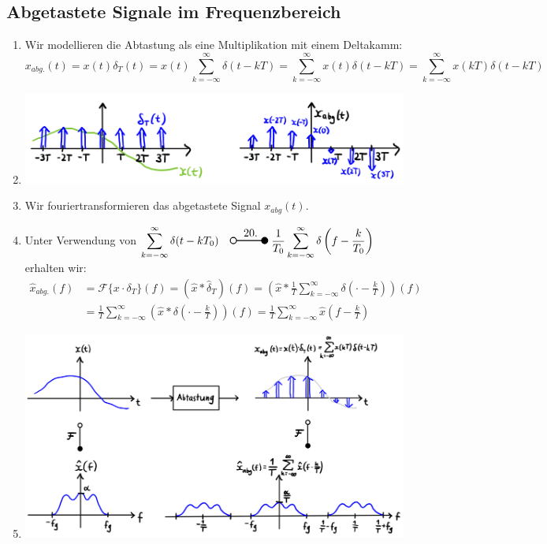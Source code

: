 \documentclass[11pt]{article}
\newcommand{\transform}[2]{%
    \begin{tikzpicture}
        \draw[thick] (0,0) circle (0.1);
        \draw[thick] (0.1,0) -- (#2,0) node[midway, above] {#1};
        \filldraw[thick] (#2,0) circle (0.1);
    \end{tikzpicture}%
}
\begin{document}
\subsection*{Abgetastete Signale im Frequenzbereich}
\vspace*{-0.5cm}
\begin{enumerate}
    \item Wir modellieren die Abtastung als eine Multiplikation mit einem Deltakamm:
    $$x_{abg.}(t) = x(t)\delta_T(t) = x(t)\sum_{k=-\infty}^{\infty} \delta(t-kT) = \sum_{k=-\infty}^{\infty}x(t)\delta(t-kT) = \sum_{k=-\infty}^{\infty} x(kT)\delta(t-kT)$$
    \vspace*{-0.5cm}
    \item[] \begin{center}
        \includegraphics[width=0.6\linewidth]{docimgs/abtastung1.jpg}
    \end{center}
    \vspace*{-0.25cm}
    \item Wir fouriertransformieren das abgetastete Signal $x_{abg}(t)$.
    \item[] Unter Verwendung von $\displaystyle\sum_{k=-\infty}^{\infty} \delta(t-kT_0) \hspace{10pt} \transform{20.}{1} \; \displaystyle\frac{1}{T_0}\displaystyle\sum_{k=-\infty}^{\infty} \delta \left( f - \frac{k}{T_0} \right)$ erhalten wir:
    \begin{align*}
        \hat{x}_{abg.}(f) &= \mathcal{F}\{x \cdot \delta_T\}(f) = \left( \hat{x} \ast \hat{\delta}_T \right)(f) = \left( \hat{x} \ast \frac{1}{T} \sum_{k=-\infty}^\infty \delta\left(\cdot - \frac{k}{T}\right) \right)(f) \\
        &= \frac{1}{T} \sum_{k=-\infty}^\infty \left( \hat{x} \ast \delta \left( \cdot - \frac{k}{T} \right) \right)(f) = \frac{1}{T} \sum_{k = -\infty}^\infty \hat{x}\left( f- \frac{k}{T} \right)
    \end{align*}
    \vspace*{-0.5cm}
    \item[] \begin{center}
        \includegraphics[width=0.8\linewidth]{docimgs/abtastung2.jpg}

\end{center}
\end{enumerate}
\end{document}

